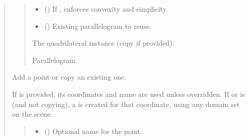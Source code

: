 \documentclass[letterpaper,10pt,english]{sphinxmanual}
\begin{document}
\begin{quote}
\begin{fulllineitems}
\begin{fulllineitems}
\begin{quote}
\begin{description}
\begin{itemize}
\item {} 
\sphinxAtStartPar
{} () \textendash{} If , enforces convexity and simplicity.

\item {} 
\sphinxAtStartPar
{} (\sphinxstyleliteralemphasis{\sphinxupquote{ | }}) \textendash{} Existing parallelogram to reuse.

\end{itemize}

\sphinxAtStartPar
The quadrilateral instance (copy if provided).

\sphinxAtStartPar
Parallelogram

\end{description}\end{quote}

\end{fulllineitems}


\begin{fulllineitems}
\label{\detokenize{pygeox:pygeox.add_objects.AddNamespace.point}}
\pysigstartsignatures
\pysiglinewithargsret
{}
{\sphinxparamcomma {}\sphinxparamcomma {}\sphinxparamcomma {}}
{}
\pysigstopsignatures
\sphinxAtStartPar
Add a point or copy an existing one.

\sphinxAtStartPar
If  is provided, its coordinates and name are used unless
overridden. If  or  is  (and not copying), a
 is created for that coordinate, using any
domain set on the scene.
\begin{quote}\begin{description}
\begin{itemize}
\item {} 
\sphinxAtStartPar
{} () \textendash{} Optional name for the point.


\end{itemize}
\end{description}
\end{quote}
\end{fulllineitems}
\end{fulllineitems}
\end{quote}
\end{document}
